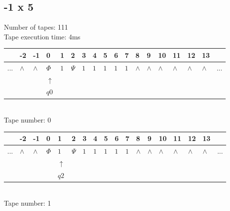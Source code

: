 \documentclass[11pt]{article}
\begin{document}
\clearpage

\subsection{-1 x 5}
Number of tapes: 111\\
Tape execution time: 4ms\\

\begin{table}[H]
\centering
\begin{tabular}{llllllllllllllllll}
 & -2 & -1 & 0 & 1 & 2 & 3 & 4 & 5 & 6 & 7 & 8 & 9 & 10 & 11 & 12 & 13 & \\
\hline
$...$ & \multicolumn{1}{|l|}{$\wedge$} & \multicolumn{1}{|l|}{$\wedge$} & \multicolumn{1}{|l|}{$\Phi$} & \multicolumn{1}{|l|}{$1$} & \multicolumn{1}{|l|}{$\Psi$} & \multicolumn{1}{|l|}{$1$} & \multicolumn{1}{|l|}{$1$} & \multicolumn{1}{|l|}{$1$} & \multicolumn{1}{|l|}{$1$} & \multicolumn{1}{|l|}{$1$} & \multicolumn{1}{|l|}{$\wedge$} & \multicolumn{1}{|l|}{$\wedge$} & \multicolumn{1}{|l|}{$\wedge$} & \multicolumn{1}{|l|}{$\wedge$} & \multicolumn{1}{|l|}{$\wedge$} & \multicolumn{1}{|l|}{$\wedge$} & $...$\\
\hline
&  &  & $\uparrow$ &  &  &  &  &  &  &  &  &  &  &  &  &  &  \\
&  &  & $ q0 $ &  &  &  &  &  &  &  &  &  &  &  &  &  &  \\
\end{tabular}
\\
Tape number: 0
\noindent\makebox[\linewidth]{\hdashrule{\textwidth}{1pt}{1pt}}\end{table}

\begin{table}[H]
\centering
\begin{tabular}{llllllllllllllllll}
 & -2 & -1 & 0 & 1 & 2 & 3 & 4 & 5 & 6 & 7 & 8 & 9 & 10 & 11 & 12 & 13 & \\
\hline
$...$ & \multicolumn{1}{|l|}{$\wedge$} & \multicolumn{1}{|l|}{$\wedge$} & \multicolumn{1}{|l|}{$\Phi$} & \multicolumn{1}{|l|}{$1$} & \multicolumn{1}{|l|}{$\Psi$} & \multicolumn{1}{|l|}{$1$} & \multicolumn{1}{|l|}{$1$} & \multicolumn{1}{|l|}{$1$} & \multicolumn{1}{|l|}{$1$} & \multicolumn{1}{|l|}{$1$} & \multicolumn{1}{|l|}{$\wedge$} & \multicolumn{1}{|l|}{$\wedge$} & \multicolumn{1}{|l|}{$\wedge$} & \multicolumn{1}{|l|}{$\wedge$} & \multicolumn{1}{|l|}{$\wedge$} & \multicolumn{1}{|l|}{$\wedge$} & $...$\\
\hline
&  &  &  & $\uparrow$ &  &  &  &  &  &  &  &  &  &  &  &  &  \\
&  &  &  & $ q2 $ &  &  &  &  &  &  &  &  &  &  &  &  &  \\
\end{tabular}
\\
Tape number: 1
\noindent\makebox[\linewidth]{\hdashrule{\textwidth}{1pt}{1pt}}\end{table}
\end{document}
